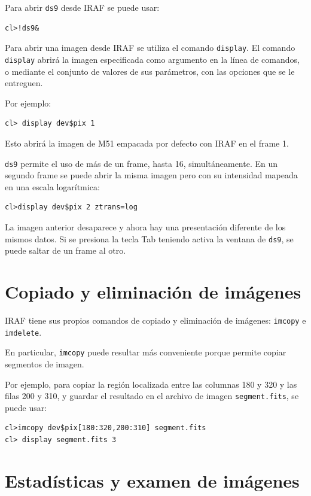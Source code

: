 Para abrir \texttt{ds9} desde IRAF se puede usar:

\begin{verbatim}
cl>!ds9&
\end{verbatim}

Para abrir una imagen desde IRAF se utiliza el comando \texttt{display}. El comando \texttt{display} abrirá la imagen especificada como argumento en la línea de comandos, o mediante el conjunto de valores de sus parámetros, con las opciones que se le entreguen.

Por ejemplo:

\begin{verbatim}
cl> display dev$pix 1
\end{verbatim}

Esto abrirá la imagen de M51 empacada por defecto con IRAF en el frame 1.

\texttt{ds9} permite el uso de más de un frame, hasta 16, simultáneamente. En un segundo frame se puede abrir la misma imagen pero con su intensidad mapeada en una escala logarítmica:

\begin{verbatim}
cl>display dev$pix 2 ztrans=log
\end{verbatim}

La imagen anterior desaparece y ahora hay una presentación diferente de los mismos datos. Si se presiona la tecla Tab teniendo activa la ventana de \texttt{ds9}, se puede saltar de un frame al otro.

\section{Copiado y eliminación de imágenes}

IRAF tiene sus propios comandos de copiado y eliminación de imágenes: \texttt{imcopy} e \texttt{imdelete}.

En particular, \texttt{imcopy} puede resultar más conveniente porque permite copiar segmentos de imagen.

Por ejemplo, para copiar la región localizada entre las columnas 180 y 320 y las filas 200 y 310, y guardar el resultado en el archivo de imagen \texttt{segment.fits}, se puede usar:

\begin{verbatim}
cl>imcopy dev$pix[180:320,200:310] segment.fits
cl> display segment.fits 3
\end{verbatim}

\section{Estadísticas y examen de imágenes}

